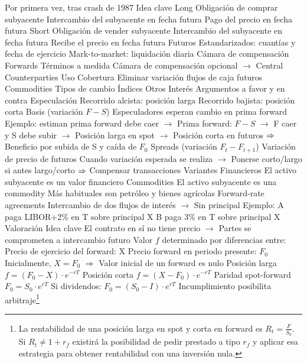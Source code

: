 \documentclass{nuevotema}
\begin{document}
\begin{esquemal}
				\4[] Por primera vez, tras crash de 1987
	\1 
		\2 Idea clave
			\3 Long
				\4 Obligación de comprar subyacente
				\4 Intercambio del subyacente en fecha futura
				\4 Pago del precio en fecha futura
			\3 Short
				\4 Obligación de vender subyacente
				\4 Intercambio del subyacente en fecha futura
				\4 Recibe el precio en fecha futura
			\3 Futuros
				\4 Estandarizados: cuantías y fecha de ejercicio
				\4 Mark-to-market: liquidación diaria
				\4 Cámara de compensación
			\3 Forwards
				\4 Términos a medida
				\4 Cámara de compensación opcional
				\4 $\to$ Central Counterparties
		\2 Uso
			\3 Cobertura
				\4 Eliminar variación flujos de caja futuros
				\4 Commodities
				\4 Tipos de cambio
				\4 Índices
				\4 Otros
				\4 Interés
				\4 Argumentos a favor y en contra
			\3 Especulación
				\4 Recorrido alcista: posición larga
				\4 Recorrido bajista: posición corta
				\4 Basis (variación $F-S$)
				\4[] Especuladores esperan cambio en prima forward
				\4[] Ejemplo: estiman prima forward debe caer
				\4[] $\to$ Prima forward: $F-S$
				\4[] $\to$ F caer y S debe subir
				\4[] $\to$ Posición larga en spot
				\4[] $\to$ Posición corta en futuros
				\4[] $\Rightarrow$ Beneficio por subida de S y caída de $F_0$
				\4 Spreads (variación $F_t - F_{t+1}$)
				\4[] Variación de precio de futuros
				\4[] Cuando variación esperada se realiza
				\4[] $\to$ Ponerse corto/largo si antes largo/corto
				\4[] $\Rightarrow$ Compensar transacciones
		\2 Variantes
			\3 Financieros
				\4 El activo subyacente es un valor financiero
			\3 Commodities
				\4 El activo subyacente es una commodity
				\4 Más habituales son petróleo y bienes agrícolas
			\3 Forward-rate agreements
				\4 Intercambio de dos flujos de interés
				\4[] $\to$ Sin principal
				\4 Ejemplo:
				\4[] A paga LIBOR+2\% en T sobre principal X
				\4[] B paga 3\% en T sobre principal X
		\2 Valoración
			\3 Idea clave
				\4 El contrato en sí no tiene precio
				\4[] $\to$ Partes se comprometen a intercambio futuro
				\4 Valor $f$ determinado por diferencias entre:
				\4[] Precio de ejercicio del forward: X
				\4[] Precio forward en periodo presente: $F_0$
				\4 Inicialmente, $X = F_0$
				\4[] $\Rightarrow$ Valor inicial de un forward es nulo
			\3 Posición larga
				\4 $f = (F_0 - X) \cdot e^{-rT}$
			\3 Posición corta
				\4 $f = (X - F_0) \cdot e^{-rT}$
			\3 Paridad spot-forward
				\4 $F_0 = S_0 \cdot e^{rT}$
				\4 Si dividendos: $F_0 = (S_0 - I)\cdot e^{rT}$
				\4 Incumplimiento posibilita arbitraje\footnote{La rentabilidad de una posición larga en spot y corta en forward es $R_t = \frac{F}{S_0}$. Si $R_t \neq 1 + r_f$ existirá la posibilidad de pedir prestado a tipo $r_f$ y aplicar esa estrategia para obtener rentabilidad con una inversión nula.}

\end{esquemal}
\end{document}
